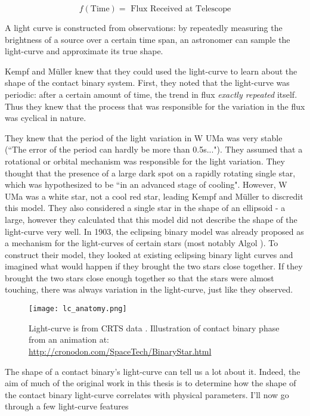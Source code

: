 \documentclass[12pt]{article} %
\numberwithin{equation}{section} %
\begin{document}
\begin{equation} \label{eqn: light_curve}
f(\text{Time}) = \text{ Flux Received at Telescope}
\end{equation}

A light curve is constructed from observations: by repeatedly measuring the brightness of a source over a certain time span, an astronomer can sample the light-curve and approximate its true shape.

Kempf and M\"{u}ller knew that they could used the light-curve to learn about the shape of the contact binary system. First, they noted that the light-curve was periodic: after a certain amount of time, the trend in flux \emph{exactly repeated} itself. Thus they knew that the process that was responsible for the variation in the flux was cyclical in nature. 

They knew that the period of the light variation in W UMa was very stable (``The error of the period can hardly be more than 0.5s..."). They assumed that a rotational or orbital mechanism was responsible for the light variation. They thought that the presence of a large dark spot on a rapidly rotating single star, which was hypothesized to be ``in an advanced stage of cooling". However, W UMa was a white star, not a cool red star, leading Kempf and M\"{u}ller to discredit this model. They also considered a single star in the shape of an ellipsoid - a large, however they calculated that this model did not describe the shape of the light-curve very well. In 1903, the eclipsing binary model was already proposed as a mechanism for the light-curves of certain stars (most notably Algol ). To construct their model, they looked at existing eclipsing binary light curves and imagined what would happen if they brought the two stars close together. If they brought the two stars close enough together so that the stars were almost touching, there was always variation in the light-curve, just like they observed.

\begin{figure}[H]
\centering
\texttt{[image: lc\_anatomy.png]}
\caption{Light-curve is from CRTS data \citep{drake2014catalina}. Illustration of contact binary phase from an animation at: \url{http://cronodon.com/SpaceTech/BinaryStar.html}}
\label{fig: lc_anatomy}
\end{figure}

The shape of a contact binary's light-curve can tell us a lot about it. Indeed, the aim of much of the original work in this thesis is to determine how the shape of the contact binary light-curve correlates with physical parameters. I'll now go through a few light-curve features 
\end{document}
